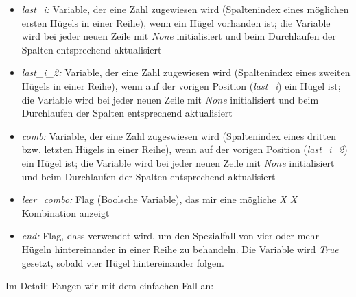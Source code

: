 \documentclass[a4paper,10pt,ngerman]{scrartcl}
\begin{document}
\begin{itemize}
    \item \textit{last\_i:} Variable, der eine Zahl zugewiesen wird (Spaltenindex eines möglichen ersten Hügels in einer Reihe), wenn ein Hügel vorhanden ist; die Variable wird bei jeder neuen Zeile mit \textit{None} initialisiert und beim Durchlaufen der Spalten entsprechend aktualisiert
    \item \textit{last\_i\_2:} Variable, der eine Zahl zugewiesen wird (Spaltenindex eines zweiten Hügels in einer Reihe), wenn auf der vorigen Position (\textit{last\_i}) ein Hügel ist; die Variable wird bei jeder neuen Zeile mit \textit{None} initialisiert und beim Durchlaufen der Spalten entsprechend aktualisiert
    \item \textit{comb:} Variable, der eine Zahl zugeswiesen wird (Spaltenindex eines dritten bzw. letzten Hügels in einer Reihe), wenn auf der vorigen Position (\textit{last\_i\_2}) ein Hügel ist; die Variable wird bei jeder neuen Zeile mit \textit{None} initialisiert und beim Durchlaufen der Spalten entsprechend aktualisiert   
    \item \textit{leer\_combo:} Flag (Boolsche Variable), das mir eine mögliche \textit{X X} Kombination anzeigt
    \item \textit{end:} Flag, dass verwendet wird, um den Spezialfall von vier oder mehr Hügeln hintereinander in einer Reihe zu behandeln. Die Variable wird \textit{True} gesetzt, sobald vier Hügel hintereinander folgen.    
\end{itemize} 
Im Detail: 
Fangen wir mit dem einfachen Fall an:
\end{document}
